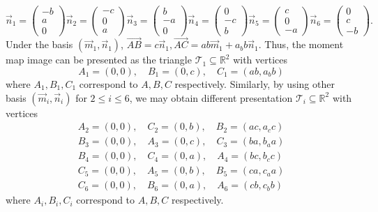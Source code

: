 \documentclass[11pt]{article}
\theoremstyle{definition}
\theoremstyle{remark}
\newcommand{\R}{\mathbb{R}}
\begin{document}
 \[\vec{n}_1=\begin{pmatrix}-b\\a\\0\end{pmatrix}
 \vec{n}_2=\begin{pmatrix}-c\\0\\a\end{pmatrix}
 \vec{n}_3=\begin{pmatrix}b\\-a\\0\end{pmatrix}
 \vec{n}_4=\begin{pmatrix}0\\-c\\b\end{pmatrix}
 \vec{n}_5=\begin{pmatrix}c\\0\\-a\end{pmatrix}
 \vec{n}_6=\begin{pmatrix}0\\c\\-b\end{pmatrix}.\] 
Under the basis $(\vec{m}_1,\vec{n}_1)$, $\overrightarrow{AB}=c\vec{n}_1,\overrightarrow{AC}=ab\vec{m}_1+a_bb\vec{n}_1$. Thus, the moment map image can be presented as the triangle $\mathcal{T}_1\subseteq \R^2$ with vertices
\[A_1=(0,0),\quad B_1=(0,c),\quad C_1=(ab,a_bb)\]
where $A_1,B_1,C_1$ correspond to $A,B,C$ respectively. Similarly, by using other basis $(\vec{m}_i,\vec{n}_i)$ for $2\leq i\leq 6$, we may obtain different presentation $\mathcal{T}_i\subseteq \R^2$ with vertices
\begin{align*}
  A_2=(0,0),\quad C_2=(0,b),\quad B_2=(ac,a_cc)\\
  B_3=(0,0),\quad A_3=(0,c),\quad C_3=(ba,b_aa)\\
  B_4=(0,0),\quad C_4=(0,a),\quad A_4=(bc,b_cc)\\
  C_5=(0,0),\quad A_5=(0,b),\quad B_5=(ca,c_aa)\\
  C_6=(0,0),\quad B_6=(0,a),\quad A_6=(cb,c_bb)
\end{align*}
where $A_i,B_i,C_i$ correspond to $A,B,C$ respectively.
\end{document}
